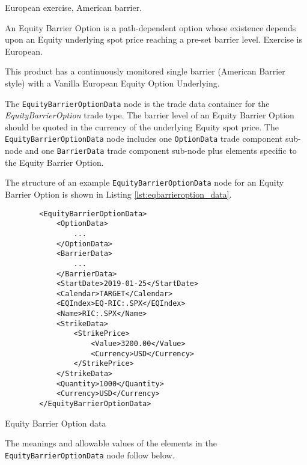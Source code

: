 \else

European exercise, American barrier.

An Equity Barrier Option is a path-dependent option whose existence depends upon an Equity underlying
spot price reaching a pre-set barrier level. Exercise is European.

This product has a continuously monitored single barrier (American Barrier style) with a Vanilla
European Equity Option Underlying.

\fi

The \lstinline!EquityBarrierOptionData!  node is the trade data container for the \emph{EquityBarrierOption} trade type. The barrier level of an Equity Barrier Option should be quoted in the currency of 
the underlying Equity spot price. The \lstinline!EquityBarrierOptionData!  node includes one  \lstinline!OptionData! trade component sub-node and one \lstinline!BarrierData! trade component sub-node plus elements
specific to the Equity Barrier Option. 

The structure of an example \lstinline!EquityBarrierOptionData! node for an Equity Barrier Option is shown in Listing
\ref{lst:eqbarrieroption_data}.

\begin{listing}[H]
\begin{verbatim}
        <EquityBarrierOptionData>
            <OptionData>
                ...
            </OptionData>
            <BarrierData>
                ...
            </BarrierData>
            <StartDate>2019-01-25</StartDate>
            <Calendar>TARGET</Calendar>
            <EQIndex>EQ-RIC:.SPX</EQIndex>            
            <Name>RIC:.SPX</Name>
            <StrikeData>
				<StrikePrice>
					<Value>3200.00</Value>
					<Currency>USD</Currency>
				</StrikePrice>
            </StrikeData>
            <Quantity>1000</Quantity>
            <Currency>USD</Currency>
        </EquityBarrierOptionData>
\end{verbatim}
\caption{Equity Barrier Option data}
\label{lst:eqbarrieroption_data}
\end{listing}

The meanings and allowable values of the elements in the \lstinline!EquityBarrierOptionData!  node follow below.


